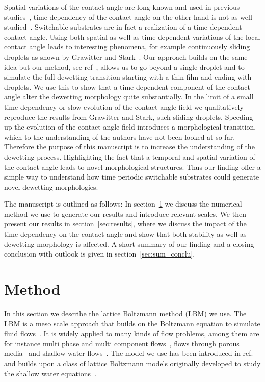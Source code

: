 \documentclass[twocolumn,amsmath,amssymb,showpacs,pre,nofootinbib,superscriptaddress]{revtex4-1} %
\begin{document}
Spatial variations of the contact angle are long known and used in previous studies~\cite{PhysRevE.91.023013, Sommers_2006}, time dependency of the contact angle on the other hand is not as well studied~\cite{suman2006dynamics}. 
Switchable substrates are in fact a realization of a time dependent contact angle. 
Using both spatial as well as time dependent variations of the local contact angle leads to interesting phenomena, for example continuously sliding droplets as shown by Grawitter and Stark~\cite{D0SM02082F}.  
Our approach builds on the same idea but our method, see ref~\cite{PhysRevE.100.033313}, allows us to go beyond a single droplet and to simulate the full dewetting transition starting with a thin film and ending with droplets.
We use this to show that a time dependent component of the contact angle alter the dewetting morphology quite substantially.
In the limit of a small time dependency or slow evolution of the contact angle field we qualitatively reproduce the results from Grawitter and Stark, such sliding droplets.
Speeding up the evolution of the contact angle field introduces a morphological transition, which to the understanding of the authors have not been looked at so far.
Therefore the purpose of this manuscript is to increase the understanding of the dewetting process.
Highlighting the fact that a temporal and spatial variation of the contact angle leads to novel morphological structures.
Thus our finding offer a simple way to understand how time periodic switchable substrates could generate novel dewetting morphologies.

The manuscript is outlined as follows:
In section~\ref{sec:method} we discuss the numerical method we use to generate our results and introduce relevant scales.
We then present our results in section~\ref{sec:results}, where we discuss the impact of the time dependency on the contact angle and show that both stability as well as dewetting morphology is affected.
A short summary of our finding and a closing conclusion with outlook is given in section~\ref{sec:sum_conclu}.

\section{Method}\label{sec:method}
In this section we describe the lattice Boltzmann method (LBM) we use.
The LBM is a meso scale approach that builds on the Boltzmann equation to simulate fluid flows~\cite{krueger2017}. 
It is widely applied to many kinds of flow problems, among them are for instance multi phase and multi component flows~\cite{shan1993lattice,PhysRevE.73.047701}, flows through porous media~\cite{liu2016multiphase} and shallow water flows~\cite{Salmon:1999:0022-2402:503, zhou2004lattice, PhysRevE.65.036309}.
The model we use has been introduced in ref.~\cite{PhysRevE.100.033313} and builds upon a class of lattice Boltzmann models originally developed to study the shallow water equations~\cite{Salmon:1999:0022-2402:503, PhysRevE.65.036309}.
\end{document}
